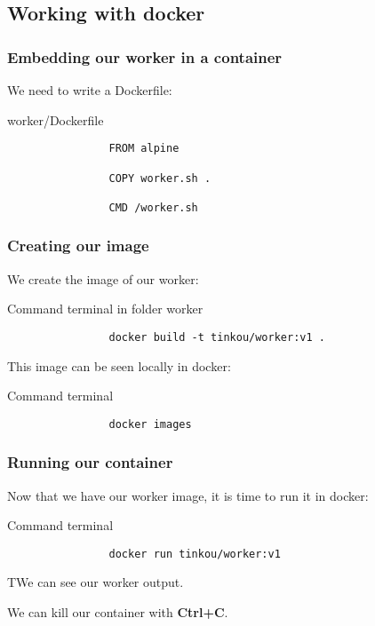 \subsection{Working with docker}

	\begin{frame}[fragile]
		\frametitle{Embedding our worker in a container}
		
		We need to write a Dockerfile:
		
		\begin{block}{worker/Dockerfile}
			\begin{verbatim}
				FROM alpine

				COPY worker.sh .

				CMD /worker.sh
			\end{verbatim}
		\end{block}
	\end{frame}
	
	\begin{frame}[fragile]
		\frametitle{Creating our image}
		
		We create the image of our worker:
		
		\begin{block}{Command terminal in folder worker}
			\begin{verbatim}
				docker build -t tinkou/worker:v1 .
			\end{verbatim}
		\end{block}
		
		This image can be seen locally in docker:

		\begin{block}{Command terminal}
			\begin{verbatim}
				docker images
			\end{verbatim}
		\end{block}
		
	\end{frame}
	
	\begin{frame}[fragile]
		\frametitle{Running our container}
		
		Now that we have our worker image, it is time to run it in docker:
		
		\begin{block}{Command terminal}
			\begin{verbatim}
				docker run tinkou/worker:v1
			\end{verbatim}
		\end{block}
		TWe can see our worker output.
		
		We can kill our container with \textbf{Ctrl+C}.
		
	\end{frame}
	
